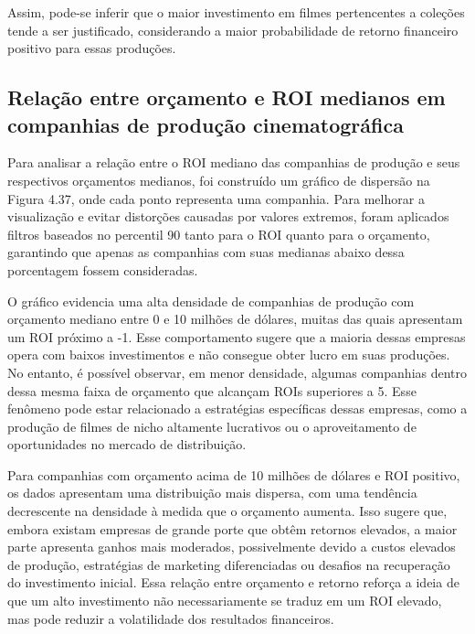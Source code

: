 Assim, pode-se inferir que o maior investimento em filmes pertencentes a coleções tende a ser justificado, considerando a maior probabilidade de retorno financeiro positivo para essas produções.

\subsection{Relação entre orçamento e \acrshort{ROI} medianos em companhias de produção cinematográfica}\label{kde-budget-roi-companies}%
Para analisar a relação entre o \acrshort{ROI} mediano das companhias de produção e seus respectivos orçamentos medianos, foi construído um gráfico de dispersão na Figura 4.37, onde cada ponto representa uma companhia. Para melhorar a visualização e evitar distorções causadas por valores extremos, foram aplicados filtros baseados no percentil 90 tanto para o \acrshort{ROI} quanto para o orçamento, garantindo que apenas as companhias com suas medianas abaixo dessa porcentagem fossem consideradas.

%

O gráfico evidencia uma alta densidade de companhias de produção com orçamento mediano entre 0 e 10 milhões de dólares, muitas das quais apresentam um \acrshort{ROI} próximo a -1. Esse comportamento sugere que a maioria dessas empresas opera com baixos investimentos e não consegue obter lucro em suas produções. No entanto, é possível observar, em menor densidade, algumas companhias dentro dessa mesma faixa de orçamento que alcançam \acrshort{ROI}s superiores a 5. Esse fenômeno pode estar relacionado a estratégias específicas dessas empresas, como a produção de filmes de nicho altamente lucrativos ou o aproveitamento de oportunidades no mercado de distribuição.

Para companhias com orçamento acima de 10 milhões de dólares e \acrshort{ROI} positivo, os dados apresentam uma distribuição mais dispersa, com uma tendência decrescente na densidade à medida que o orçamento aumenta. Isso sugere que, embora existam empresas de grande porte que obtêm retornos elevados, a maior parte apresenta ganhos mais moderados, possivelmente devido a custos elevados de produção, estratégias de marketing diferenciadas ou desafios na recuperação do investimento inicial. Essa relação entre orçamento e retorno reforça a ideia de que um alto investimento não necessariamente se traduz em um \acrshort{ROI} elevado, mas pode reduzir a volatilidade dos resultados financeiros.

